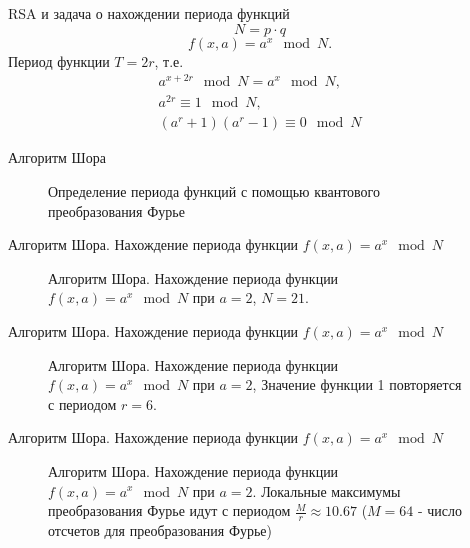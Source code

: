 \documentclass[10pt,pdf,hyperref={unicode}]{beamer}
\begin{document}
\begin{frame}{RSA и задача о нахождении периода функций}
\[
N = p \cdot q
\]
\[
f\left(x, a\right) = a^x \mod N.
\]
Период функции $T = 2r$, т.е.
\begin{eqnarray}
a^{x+2r} \mod N = a^x \mod N,
\nonumber \\
a^{2r} \equiv 1 \mod N,
\nonumber \\
(a^r + 1)(a^r - 1)  \equiv 0 \mod N
\nonumber
\end{eqnarray}
\end{frame}

\begin{frame}{Алгоритм Шора}
\begin{figure}
\centering

\scalebox{.8}{}

\caption{ Определение периода функций с помощью квантового
  преобразования Фурье}
\end{figure}
\end{frame}


\begin{frame}{Алгоритм Шора. Нахождение периода функции 
  $f\left(x, a\right) = a^x \mod{N}$}
\begin{figure}
\centering

\scalebox{.65}{}

\caption{Алгоритм Шора. Нахождение периода функции 
  $f\left(x, a\right) = a^x \mod{N}$ при $a=2$, $N = 21$.}
\end{figure}
\end{frame}

\begin{frame}{Алгоритм Шора. Нахождение периода функции 
  $f\left(x, a\right) = a^x \mod{N}$}
\begin{figure}
\centering

\scalebox{.65}{}

\caption{Алгоритм Шора. Нахождение периода функции 
  $f\left(x, a\right) = a^x \mod{N}$ при $a=2$,  
  Значение функции 1 повторяется с периодом $r=6$.}
\end{figure}
\end{frame}

\begin{frame}{Алгоритм Шора. Нахождение периода функции 
  $f\left(x, a\right) = a^x \mod{N}$}
\begin{figure}
\centering

\scalebox{.6}{}

\caption{Алгоритм Шора. Нахождение периода функции 
  $f\left(x, a\right) = a^x \mod{N}$ при $a=2$. 
  Локальные максимумы преобразования Фурье 
  идут с периодом $\frac{M}{r} \approx 10.67$ ($M = 64$ - число отсчетов
  для преобразования Фурье)}
\end{figure}
\end{frame}
\end{document}

